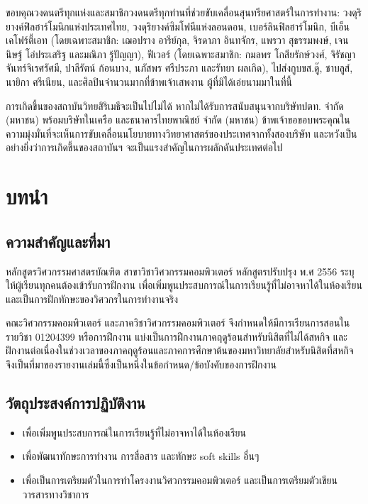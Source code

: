 \documentclass[16pt,a4]{internshipreport}
\begin{document}
ขอบคุณวงดนตรีทุกแห่งและสมาชิกวงดนตรีทุกท่านที่ช่วยขับเคลื่อนสุนทรียศาสตร์ในการทำงาน:
วงดุริยางค์ฟิลฮาร์โมนิกแห่งประเทศไทย, วงดุริยางค์ซิมโฟนีแห่งลอนดอน, เบอร์ลินฟิลฮาร์โมนิก,
บีเอ็นเคโฟร์ตี้เอท (โดยเฉพาะสมาชิก: เฌอปราง อารีย์กุล, จิรดาภา อินทจักร, แพรวา สุธรรมพงษ์,
เจนนิษฐ์ โอ่ประเสริฐ และมณิภา รู้ปัญญา), ฟีเวอร์ (โดยเฉพาะสมาชิก: กมลพร โกสียรักษ์วงศ์,
จิรัชญา จันทร์จิเรศรัศมี, ปาลีรัตน์ ก้อนบาง, นภัสพร ศรีประภา และรัทยา ผลเกิด), ไปส่งกูบขส.ดู๊,
ชาบลูส์, นายิกา ศรีเนียน, และศิลปินจำนวนมากที่ข้าพเจ้าเสพงาน ผู้ที่มิได้เอ่ยนามมาในที่นี้

การเกิดขึ้นของสถาบันวิทยสิริเมธีจะเป็นไปไม่ได้ หากไม่ได้รับการสนับสนุนจากบริษัทปตท. จำกัด (มหาชน)
พร้อมบริษัทในเครือ และธนาคารไทยพาณิชย์ จำกัด (มหาชน) 
ข้าพเจ้าขอขอบพระคุณในความมุ่งมั่นที่จะเห็นการขับเคลื่อนนโยบายทางวิทยาศาสตร์ของประเทศจากทั้งสองบริษัท
และหวังเป็นอย่างยิ่งว่าการเกิดขี้นของสถาบันฯ จะเป็นแรงสำคัญในการผลักดันประเทศต่อไป

\tableofcontents

\listoffigures

\listoftables

\chapter{บทนำ}

\section{ความสำคัญและที่มา}
หลักสูตรวิศวกรรมศาสตรบัณฑิต สาขาวิชาวิศวกรรมคอมพิวเตอร์ หลักสูตรปรับปรุง พ.ศ 2556
ระบุให้ผู้เรียนทุกคนต้องเข้ารับการฝึกงาน เพื่อเพิ่มพูนประสบการณ์ในการเรียนรู้ที่ไม่อาจหาได้ในห้องเรียน
และเป็นการฝึกทักษะของวิศวกรในการทำงานจริง

คณะวิศวกรรมคอมพิวเตอร์ และภาควิชาวิศวกรรมคอมพิวเตอร์ จึงกำหนดให้มีการเรียนการสอนในรายวิชา
01204399 หรือการฝึกงาน แบ่งเป็นการฝึกงานภาคฤดูร้อนสำหรับนิสิตที่ไม่ได้สหกิจ
และฝึกงานต่อเนื่องในช่วงเวลาของภาคฤดูร้อนและภาคการศึกษาต้นของมหาวิทยาลัยสำหรับนิสิตที่สหกิจ
จึงเป็นที่มาของรายงานเล่มนี้ซึ่งเป็นหนึ่งในข้อกำหนด/ข้อบังคับของการฝึกงาน

\section{วัตถุประสงค์การปฏิบัติงาน}
\begin{itemize}
    \item เพื่อเพิ่มพูนประสบการณ์ในการเรียนรู้ที่ไม่อาจหาได้ในห้องเรียน
    \item เพื่อพัฒนาทักษะการทำงาน การสื่อสาร และทักษะ soft skills อื่นๆ
    \item เพื่อเป็นการเตรียมตัวในการทำโครงงานวิศวกรรมคอมพิวเตอร์ และเป็นการเตรียมตัวเขียนวารสารทางวิชาการ
\end{itemize}
\end{document}
